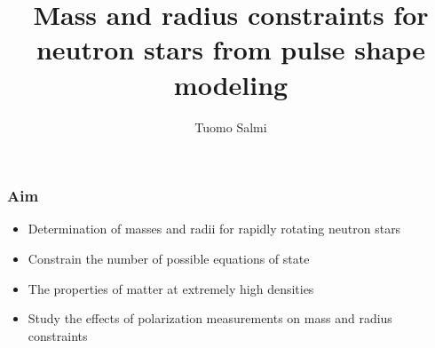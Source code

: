 \documentclass{beamer}
\title{Mass and radius constraints for neutron stars from pulse shape modeling }
\author{Tuomo Salmi} %
\institute[UTU] %
{
University of Turku \\ %
\medskip
\textit{thjsal@utu.fi} %
}
\begin{document}
\begin{frame}
\titlepage %
\end{frame}





\begin{frame}
\frametitle{Aim}
\begin{itemize}
\item Determination of masses and radii for rapidly rotating neutron stars 
\item Constrain the number of possible equations of state
\item The properties of matter at extremely high densities
\item Study the effects of polarization measurements on mass and radius constraints
\end{itemize}
\end{frame}
\end{document}
